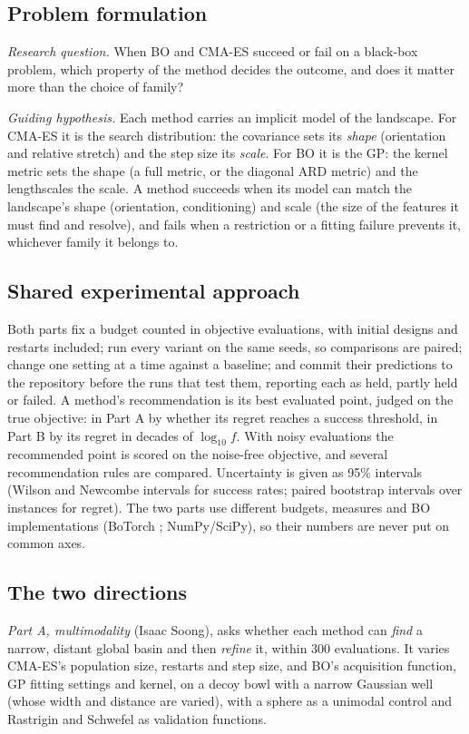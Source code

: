 \documentclass[10pt,a4paper]{article}
\begin{document}
\subsection{Problem formulation}
\emph{Research question.} When BO and CMA-ES succeed or fail on a black-box problem, which property of the
method decides the outcome, and does it matter more than the choice of family?

\emph{Guiding hypothesis.} Each method carries an implicit model of the landscape. For CMA-ES it is the search
distribution: the covariance sets its \emph{shape} (orientation and relative stretch) and the step size its
\emph{scale}. For BO it is the GP: the kernel metric sets the shape (a full metric, or the diagonal ARD metric)
and the lengthscales the scale. A method succeeds when its model can match the landscape's shape (orientation,
conditioning) and scale (the size of the features it must find and resolve), and fails when a restriction or a
fitting failure prevents it, whichever family it belongs to.

\subsection{Shared experimental approach}
Both parts fix a budget counted in objective evaluations, with initial designs and restarts included; run
every variant on the same seeds, so comparisons are paired; change one setting at a time against a baseline;
and commit their predictions to the repository before the runs that test them, reporting each as held, partly
held or failed. A method's recommendation is its best evaluated point, judged on the true objective: in Part A
by whether its regret reaches a success threshold, in Part B by its regret in decades of $\log_{10} f$. With
noisy evaluations the recommended point is scored on the noise-free objective, and several recommendation
rules are compared. Uncertainty is given as 95\% intervals (Wilson and Newcombe intervals for success rates;
paired bootstrap intervals over instances for regret). The two parts use different budgets, measures and BO
implementations (BoTorch \citep{balandat2020botorch}; NumPy/SciPy), so their numbers are never put on common
axes.

\subsection{The two directions}
\emph{Part A, multimodality} (Isaac Soong), asks whether each method can \emph{find} a narrow, distant global
basin and then \emph{refine} it, within 300 evaluations. It varies CMA-ES's population size, restarts and step
size, and BO's acquisition function, GP fitting settings and kernel, on a decoy bowl with a narrow Gaussian well
(whose width and distance are varied), with a sphere as a unimodal control and Rastrigin and Schwefel as
validation functions.
\end{document}
